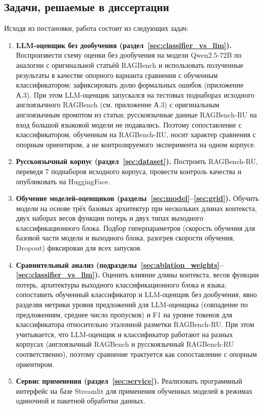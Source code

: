 \subsection{Задачи, решаемые в диссертации}

Исходя из постановки, работа состоит из следующих задач:

\begin{enumerate}
  \item \textbf{LLM-оценщик без дообучения (раздел~\ref{sec:classifier_vs_llm}).}
  Воспроизвести схему оценки без дообучения на модели Qwen2.5-72B по аналогии
  с оригинальной статьёй RAGBench и использовать полученные результаты в качестве
  опорного варианта сравнения с обученным классификатором; зафиксировать долю
  формальных ошибок (приложение А.3).
  При этом LLM-оценщик запускался на тестовых поднаборах исходного
  англоязычного RAGBench (см. приложение А.3) с оригинальным англоязычным
  промптом из статьи; русскоязычные данные RAGBench-RU на вход большой
  языковой модели не подавались. Поэтому сопоставление с классификатором,
  обученным на RAGBench-RU, носит характер сравнения с опорным ориентиром,
  а не контролируемого эксперимента на одном корпусе.
  \item \textbf{Русскоязычный корпус (раздел~\ref{sec:dataset}).} Построить RAGBench-RU,
   переведя 7 поднаборов исходного корпуса, провести контроль качества и опубликовать на HuggingFace.
  \item \textbf{Обучение моделей-оценщиков (разделы~\ref{sec:model}--\ref{sec:grid}).} Обучить модели
   на основе трёх базовых архитектур при нескольких длинах контекста, двух наборах весов функции
   потерь и двух типах выходного классификационного блока. Подбор гиперпараметров
   (скорость обучения для базовой части модели и выходного блока, разогрев скорости обучения, Dropout) фиксирован для всех запусков.
  \item \textbf{Сравнительный анализ (подразделы~\ref{sec:ablation_weights}--\ref{sec:classifier_vs_llm}).} Оценить влияние длины контекста, весов функции потерь, архитектуры выходного классификационного блока и языка; сопоставить обученный классификатор и LLM-оценщик без дообучения, явно разделяя метрики уровня предложений для LLM-оценщика (совпадение по предложениям, среднее число пропусков) и F1 на уровне токенов для классификатора относительно эталонной разметки RAGBench-RU. При этом учитывается, что LLM-оценщик и классификатор работают на разных корпусах (англоязычный RAGBench и русскоязычный RAGBench-RU соответственно), поэтому сравнение трактуется как сопоставление с опорным ориентиром.
  \item \textbf{Сервис применения (раздел~\ref{sec:service}).} Реализовать программный интерфейс на 
  базе Streamlit 
  для применения обученных моделей в режимах одиночной и пакетной обработки данных.
\end{enumerate}
